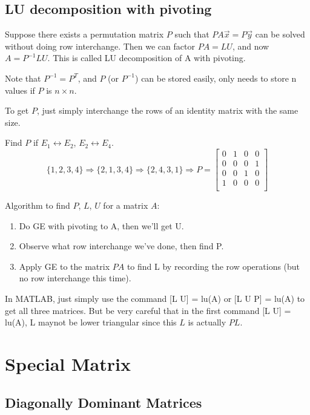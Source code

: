 	\subsection{LU decomposition with pivoting}
	Suppose there exists a permutation matrix $P$ such that $PA\vec{x} = P\vec{y}$ can be solved without doing row interchange. Then we can factor $PA = LU$, and now $A = P^{-1}LU$. This is called LU decomposition of A with pivoting.
	
	Note that $P^{-1} = P^{T}$, and $P$ (or $P^{-1}$) can be stored easily, only needs to store n values if $P$ is $n\times n$.
	
	To get $P$, just simply interchange the rows of an identity matrix with the same size.
	

	\begin{ex}
		Find $P$ if $E_1 \leftrightarrow E_2$, $E_2 \leftrightarrow E_4$.
		\[ \{1,2,3,4\} \Rightarrow \{2,1,3,4\} \Rightarrow \{2,4,3,1\} \Rightarrow P = \begin{bmatrix}
		0 & 1 & 0 & 0 \\  0 & 0 & 0 & 1 \\ 0 & 0 & 1 & 0 \\ 1 & 0 & 0 & 0 \\
		\end{bmatrix} \]
	\end{ex}
	
	
	Algorithm to find $P$, $L$, $U$ for a matrix $A$:
	\begin{enumerate}
		\item Do GE with pivoting to A, then we'll get U.\\
		\item Observe what row interchange we've done, then find P.\\
		\item Apply GE to the matrix $PA$ to find L by recording the row operations (but no row interchange this time).
	\end{enumerate}
	
	In MATLAB, just simply use the command [L U] = lu(A) or [L U P] = lu(A) to get all three matrices. But be very careful that in the first command [L U] = lu(A), L maynot be lower triangular since this $L$ is actually $PL$.


	\section{Special Matrix}
	\subsection{Diagonally Dominant Matrices}
	
